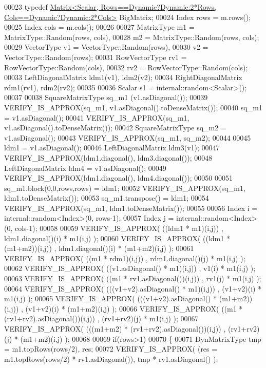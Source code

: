 \begin{DoxyCode}
00023   \textcolor{keyword}{typedef} 
      \hyperlink{group___core___module_class_eigen_1_1_matrix}{Matrix<Scalar, Rows==Dynamic?Dynamic:2*Rows, Cols==Dynamic?Dynamic:2*Cols>}
       BigMatrix;
00024   Index rows = m.rows();
00025   Index cols = m.cols();
00026 
00027   MatrixType m1 = MatrixType::Random(rows, cols),
00028              m2 = MatrixType::Random(rows, cols);
00029   VectorType v1 = VectorType::Random(rows),
00030              v2 = VectorType::Random(rows);
00031   RowVectorType rv1 = RowVectorType::Random(cols),
00032              rv2 = RowVectorType::Random(cols);
00033   LeftDiagonalMatrix ldm1(v1), ldm2(v2);
00034   RightDiagonalMatrix rdm1(rv1), rdm2(rv2);
00035   
00036   Scalar s1 = internal::random<Scalar>();
00037 
00038   SquareMatrixType sq\_m1 (v1.asDiagonal());
00039   VERIFY\_IS\_APPROX(sq\_m1, v1.asDiagonal().toDenseMatrix());
00040   sq\_m1 = v1.asDiagonal();
00041   VERIFY\_IS\_APPROX(sq\_m1, v1.asDiagonal().toDenseMatrix());
00042   SquareMatrixType sq\_m2 = v1.asDiagonal();
00043   VERIFY\_IS\_APPROX(sq\_m1, sq\_m2);
00044   
00045   ldm1 = v1.asDiagonal();
00046   LeftDiagonalMatrix ldm3(v1);
00047   VERIFY\_IS\_APPROX(ldm1.diagonal(), ldm3.diagonal());
00048   LeftDiagonalMatrix ldm4 = v1.asDiagonal();
00049   VERIFY\_IS\_APPROX(ldm1.diagonal(), ldm4.diagonal());
00050   
00051   sq\_m1.block(0,0,rows,rows) = ldm1;
00052   VERIFY\_IS\_APPROX(sq\_m1, ldm1.toDenseMatrix());
00053   sq\_m1.transpose() = ldm1;
00054   VERIFY\_IS\_APPROX(sq\_m1, ldm1.toDenseMatrix());
00055   
00056   Index i = internal::random<Index>(0, rows-1);
00057   Index j = internal::random<Index>(0, cols-1);
00058   
00059   VERIFY\_IS\_APPROX( ((ldm1 * m1)(i,j))  , ldm1.diagonal()(i) * m1(i,j) );
00060   VERIFY\_IS\_APPROX( ((ldm1 * (m1+m2))(i,j))  , ldm1.diagonal()(i) * (m1+m2)(i,j) );
00061   VERIFY\_IS\_APPROX( ((m1 * rdm1)(i,j))  , rdm1.diagonal()(j) * m1(i,j) );
00062   VERIFY\_IS\_APPROX( ((v1.asDiagonal() * m1)(i,j))  , v1(i) * m1(i,j) );
00063   VERIFY\_IS\_APPROX( ((m1 * rv1.asDiagonal())(i,j))  , rv1(j) * m1(i,j) );
00064   VERIFY\_IS\_APPROX( (((v1+v2).asDiagonal() * m1)(i,j))  , (v1+v2)(i) * m1(i,j) );
00065   VERIFY\_IS\_APPROX( (((v1+v2).asDiagonal() * (m1+m2))(i,j))  , (v1+v2)(i) * (m1+m2)(i,j) );
00066   VERIFY\_IS\_APPROX( ((m1 * (rv1+rv2).asDiagonal())(i,j))  , (rv1+rv2)(j) * m1(i,j) );
00067   VERIFY\_IS\_APPROX( (((m1+m2) * (rv1+rv2).asDiagonal())(i,j))  , (rv1+rv2)(j) * (m1+m2)(i,j) );
00068   
00069   \textcolor{keywordflow}{if}(rows>1)
00070   \{
00071     DynMatrixType tmp = m1.topRows(rows/2), res;
00072     VERIFY\_IS\_APPROX( (res = m1.topRows(rows/2) * rv1.asDiagonal()), tmp * rv1.asDiagonal() );

\end{DoxyCode}
